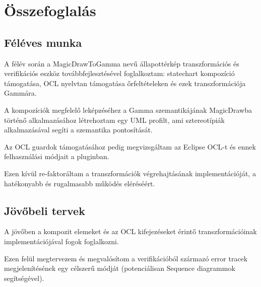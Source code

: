 \chapter{Összefoglalás}

\section{Féléves munka}
A félév során a MagicDrawToGamma nevű állapottérkép transzformációs és verifikációs eszköz továbbfejlesztésével foglalkoztam: statechart kompozíció támogatása, OCL nyelvtan támogatása őrfeltételeken és ezek transzformációja Gammára.

A kompozíciók megfelelő leképzéséhez a Gamma szemantikájának MagicDrawba történő alkalmazásához létrehoztam egy UML profilt, ami sztereotípiák alkalmazásával segíti a szemantika pontosítását.

Az OCL guardok támogatásához pedig megvizsgáltam az Eclipse OCL-t és ennek felhasználási módjait a pluginban.

Ezen kívül re-faktoráltam a transzformációk végrehajtásának implementációját, a hatékonyabb és rugalmasabb működés eléréséért.

\section{Jövőbeli tervek}

A jövőben a kompozit elemeket és az OCL kifejezéseket érintő transzformációinak implementációjával fogok foglalkozni.

Ezen felül megtervezem és megvalósítom a verifikációból származó error tracek megjelenítésének egy célszerű módját (potenciálisan Sequence diagrammok segítségével).